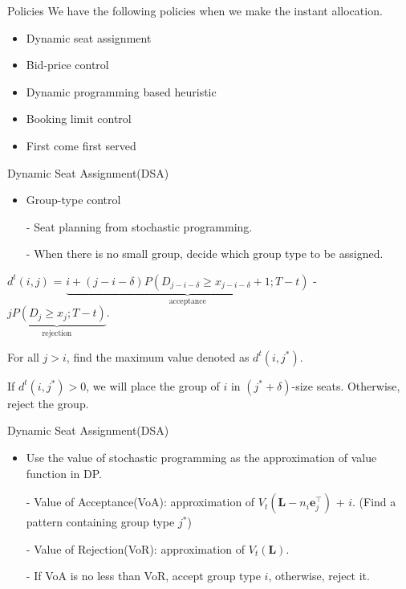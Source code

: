     \begin{frame}{Policies}
      We have the following policies when we make the instant allocation.

      \begin{itemize}
        \item Dynamic seat assignment
        \item Bid-price control
        \item Dynamic programming based heuristic
        \item Booking limit control
        \item First come first served
      \end{itemize}
    \end{frame}

    \begin{frame}{Dynamic Seat Assignment(DSA)}
      \begin{itemize}
        \item Group-type control
        \item[-] Seat planning from stochastic programming.
        \item[-] When there is no small group, decide which group type to be assigned.
      \end{itemize}
      \vspace*{1cm}
      \small
      $d^{t}(i, j)$ = $\underbrace{i + (j-i-\delta)P(D_{j-i-\delta} \geq x_{j-i-\delta}+1; T-t)}_{\text{acceptance}}$ - $\underbrace{j P(D_{j} \geq x_{j}; T-t)}_{\text{rejection}}.$
      \vspace*{1cm}

      For all $j > i$, find the maximum value denoted as $d^{t}(i, j^{*})$.
      
      If $d^{t}(i, j^{*}) > 0$, we will place the group of $i$ in $(j^{*} + \delta)$-size seats. Otherwise, reject the group.
    \end{frame}

    \begin{frame}{Dynamic Seat Assignment(DSA)}
      \begin{itemize}
        \item Use the value of stochastic programming as the approximation of value function in DP.

        \item[-] Value of Acceptance(VoA): approximation of $V_{t} (\mathbf{L}-n_i \mathbf{e}_{j}^{\top})$ + $i$. (Find a pattern containing group type $j^{*}$)
        
        \item[-] Value of Rejection(VoR): approximation of $V_{t} (\mathbf{L})$.

        \item[-] If VoA is no less than VoR, accept group type $i$, otherwise, reject it.
      \end{itemize}
    \end{frame}


